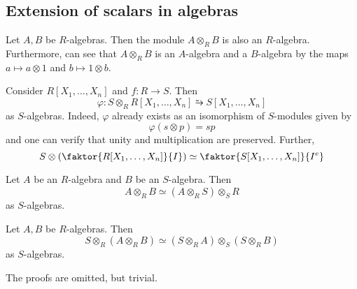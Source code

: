 \subsection{Extension of scalars in algebras}
Let \( A, B \) be \( R \)-algebras.
Then the module \( A \otimes_R B \) is also an \( R \)-algebra.
Furthermore, can see that \( A \otimes_R B \) is an \( A \)-algebra and a \( B \)-algebra by the maps \( a \mapsto a \otimes 1 \) and \( b \mapsto 1 \otimes b \).
\begin{example}
    Consider \( R[X_1, \dots, X_n] \) and \( f : R \to S \).
    Then
    \[ \varphi : S \otimes_R R[X_1, \dots, X_n] \similarrightarrow S[X_1, \dots, X_n] \]
    as \( S \)-algebras.
    Indeed, \( \varphi \) already exists as an isomorphism of \( S \)-modules given by
    \[ \varphi(s \otimes p) = sp \]
    and one can verify that unity and multiplication are preserved.
    Further,
    \[ S \otimes \qty(\faktor{R[X_1, \dots, X_n]}{I}) \simeq \faktor{S[X_1, \dots, X_n]}{I^e} \]
\end{example}
\begin{proposition}
    Let \( A \) be an \( R \)-algebra and \( B \) be an \( S \)-algebra.
    Then
    \[ A \otimes_R B \simeq (A \otimes_R S) \otimes_S R \]
    as \( S \)-algebras.
\end{proposition}
\begin{proposition}
    Let \( A, B \) be \( R \)-algebras.
    Then
    \[ S \otimes_R (A \otimes_R B) \simeq (S \otimes_R A) \otimes_S (S \otimes_R B) \]
    as \( S \)-algebras.
\end{proposition}
The proofs are omitted, but trivial.

